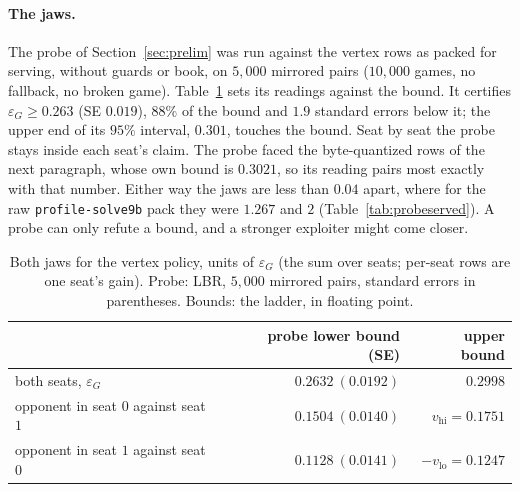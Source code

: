 \documentclass[11pt]{article}
\theoremstyle{plain}
\theoremstyle{definition}
\theoremstyle{remark}
\newcommand{\code}[1]{\texttt{\small #1}}
\newcommand{\game}{\ensuremath{G}}
\newcommand{\epsG}{\ensuremath{\varepsilon_{\game}}}
\begin{document}
\paragraph{The jaws.} The probe of Section~\ref{sec:prelim} was run
against the vertex rows as packed for serving, without guards or book,
on $5{,}000$ mirrored pairs ($10{,}000$ games, no fallback, no broken
game). Table~\ref{tab:vertexjaws} sets its readings against the bound.
It certifies $\epsG\ge0.263$ (SE $0.019$), $88\%$ of the bound and
$1.9$ standard errors below it; the upper end of its $95\%$ interval,
$0.301$, touches the bound. Seat by seat the probe stays inside each
seat's claim. The probe faced the byte-quantized rows of the next
paragraph, whose own bound is $0.3021$, so its reading pairs most
exactly with that number. Either way the jaws are less than $0.04$
apart, where for the raw \code{profile-solve9b} pack they were $1.267$
and $2$ (Table~\ref{tab:probeserved}). A probe can
only refute a bound, and a stronger exploiter might come closer.

\begin{table}[t]
\centering
\caption{Both jaws for the vertex policy, units of $\epsG$ (the sum over
seats; per-seat rows are one seat's gain). Probe: LBR, $5{,}000$
mirrored pairs, standard errors in parentheses. Bounds: the ladder,
in floating point.}
\label{tab:vertexjaws}
\small
\begin{tabular}{@{}lrr@{}}
\toprule
 & probe lower bound (SE) & upper bound\\
\midrule
both seats, $\epsG$ & $0.2632\ (0.0192)$ & $0.2998$\\
opponent in seat $0$ against seat $1$ & $0.1504\ (0.0140)$ & $v_{\mathrm{hi}}=0.1751$\\
opponent in seat $1$ against seat $0$ & $0.1128\ (0.0141)$ & $-v_{\mathrm{lo}}=0.1247$\\
\bottomrule
\end{tabular}
\end{table}
\end{document}
